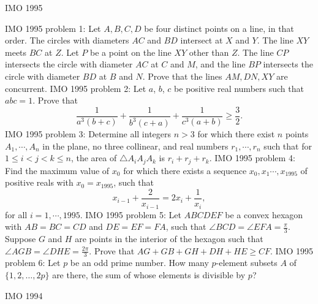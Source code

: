 IMO 1995 

IMO 1995 problem 1:  Let $ A,B,C,D$ be four distinct points on a line, in that order.  The circles with diameters $ AC$ and $ BD$ intersect at $ X$ and $ Y$. The line $ XY$ meets $ BC$ at $ Z$. Let $ P$ be a point on the line $ XY$ other than $ Z$. The line $ CP$ intersects the circle with diameter $ AC$ at $ C$ and $ M$, and the line $ BP$ intersects the circle with diameter $ BD$ at $ B$ and $ N$. Prove that the lines $ AM,DN,XY$ are concurrent. 
IMO 1995 problem 2:  Let $ a$, $ b$, $ c$ be positive real numbers such that $ abc = 1$. Prove that
\[
\frac {1}{a^3\left(b + c\right)} + \frac {1}{b^3\left(c + a\right)} + \frac {1}{c^3\left(a + b\right)}\geq \frac {3}{2}.
\] 
IMO 1995 problem 3:  Determine all integers $ n > 3$ for which there exist $ n$ points $ A_1,\cdots ,A_n$ in the plane, no three collinear, and real numbers $ r_1,\cdots ,r_n$ such that for $ 1\leq i < j < k\leq n$, the area of $ \triangle A_iA_jA_k$ is $ r_i + r_j + r_k$. 
IMO 1995 problem 4:  Find the maximum value of $ x_0$ for which there exists a sequence $ x_0,x_1\cdots ,x_{1995}$ of positive reals with $ x_0 = x_{1995}$, such that
\[ x_{i - 1} + \frac {2}{x_{i - 1}} = 2x_i + \frac {1}{x_i}, \]
for all $ i = 1,\cdots ,1995$. 
IMO 1995 problem 5:  Let $ ABCDEF$ be a convex hexagon with $ AB = BC = CD$ and $ DE = EF = FA$,  such that $ \angle BCD = \angle EFA = \frac {\pi}{3}$. Suppose $ G$ and $ H$ are points in the interior of the hexagon such that $ \angle AGB = \angle DHE = \frac {2\pi}{3}$. Prove that $ AG + GB + GH + DH + HE \geq CF$. 
IMO 1995 problem 6:  Let $ p$ be an odd prime number. How many $ p$-element subsets $ A$ of $ \{1,2,\dots,2p\}$ are there, the sum of whose elements is divisible by $ p$? 


IMO 1994 


